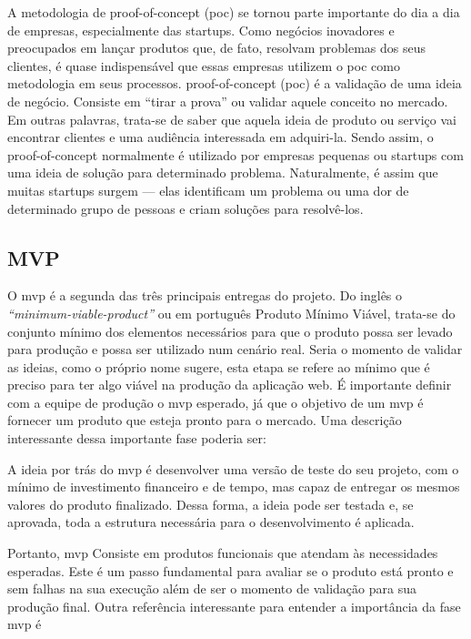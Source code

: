     \begin{citacao}
        A metodologia de \gls{proof-of-concept} (\ac{poc}) se tornou parte importante do dia a dia de empresas, especialmente das \gls{startups}. Como negócios inovadores e preocupados em lançar produtos que, de fato, resolvam problemas dos seus clientes, é quase indispensável que essas empresas utilizem o \ac{poc} como metodologia em seus processos. \gls{proof-of-concept} (\ac{poc}) é a validação de uma ideia de negócio. Consiste em “tirar a prova” ou validar aquele conceito no mercado. Em outras palavras, trata-se de saber que aquela ideia de produto ou serviço vai encontrar clientes e uma audiência interessada em adquiri-la. Sendo assim, o \ac{proof-of-concept} normalmente é utilizado por empresas pequenas ou \gls{startups} com uma ideia de solução para determinado problema. Naturalmente, é assim que muitas \gls{startups} surgem — elas identificam um problema ou uma dor de determinado grupo de pessoas e criam soluções para resolvê-los.
        \cite{ranDon2022}
    \end{citacao}
    
    \subsection{MVP}
    O \ac{mvp} é a segunda das três principais entregas do projeto.
    Do inglês o \emph{“\ac{minimum-viable-product}”} ou em português Produto Mínimo Viável, trata-se do conjunto mínimo dos elementos necessários para que o produto possa ser levado para produção e possa ser utilizado num cenário real. Seria o momento de validar as ideias, como o próprio nome sugere, esta etapa se refere ao mínimo que é preciso para ter algo viável na produção da aplicação web. 
    É importante definir com a equipe de produção o \ac{mvp} esperado, já que  o objetivo de um \ac{mvp} é fornecer um produto que esteja pronto para o mercado. Uma descrição interessante dessa importante fase poderia ser:
    
    \begin{citacao}
        A ideia por trás do \ac{mvp} é desenvolver uma versão de teste do seu projeto, com o mínimo de investimento financeiro e de tempo, mas capaz de entregar os mesmos valores do produto finalizado. Dessa forma, a ideia pode ser testada e, se aprovada, toda a estrutura necessária para o desenvolvimento é aplicada.
        \cite{rockContent2022}
    \end{citacao}
    
    Portanto, \ac{mvp} Consiste em produtos funcionais que atendam às necessidades esperadas. Este é um passo fundamental para avaliar se o produto está pronto e sem falhas na sua execução além de ser o momento de validação para sua produção final. Outra referência interessante para entender a importância da fase \ac{mvp} é
    
